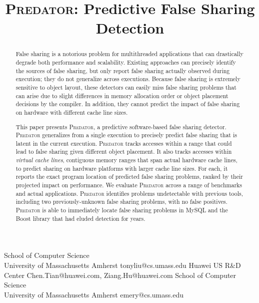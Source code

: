 \documentclass[10pt]{sigplanconf}
\date{} %
\newcommand{\Predator}{{\scshape Predator}}
\newcommand{\predator}{{\scshape Predator}}
\begin{document}
\title{\Predator{}: Predictive False Sharing Detection}

           {School of Computer Science \\
           University of Massachusetts Amherst}
           {tonyliu@cs.umass.edu}
           {Huawei US R\&D Center}
           {Chen.Tian@huawei.com, Ziang.Hu@huawei.com}
           {School of Computer Science \\
             University of Massachusetts Amherst}
           {emery@cs.umass.edu}

\maketitle

\begin{abstract}
False sharing is a notorious problem for multithreaded applications
that can drastically degrade both performance and
scalability. Existing approaches can precisely identify
the sources of false sharing, but only report false
sharing actually observed during execution; they do not generalize
across executions. Because false sharing is extremely sensitive to
object layout, these detectors can easily miss false sharing problems
that can arise due to slight differences in memory allocation order or
object placement decisions by the compiler. In addition, they cannot
predict the impact of false sharing on hardware with different cache
line sizes.

This paper presents \Predator{}, a predictive software-based false
sharing detector. \Predator{} generalizes from a single execution to
precisely predict false sharing that is latent in the current
execution. \predator{} tracks accesses within a range that could lead
to false sharing given different object placement. It also tracks
accesses within
\emph{virtual cache lines}, contiguous memory ranges that span actual
hardware cache lines, to predict sharing on hardware platforms with
larger cache line sizes. For each, it reports the exact program
location of predicted false sharing problems, ranked by their
projected impact on performance. We evaluate \Predator{} across a
range of benchmarks and actual applications. \Predator{} identifies
problems undetectable with previous tools, including two
previously-unknown false sharing problems, with no false
positives. \Predator{} is able to immediately locate false sharing problems in MySQL and the
Boost library that had eluded detection for years.
\end{abstract}
\end{document}
